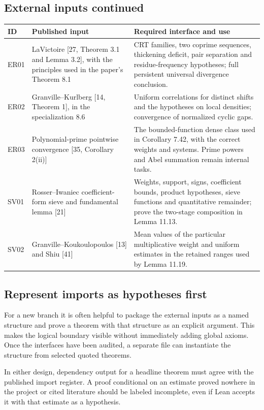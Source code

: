 \documentclass[11pt]{article}
\newcommand{\page}{\newpage}
\begin{document}
\page
\subsection*{External inputs continued}
\small
\begin{longtable}{p{.11\linewidth}p{.39\linewidth}p{.41\linewidth}}
\toprule
ID & Published input & Required interface and use\\\midrule
ER01 & LaVictoire [27, Theorem 3.1 and Lemma 3.2], with the principles used in the paper's Theorem 8.1 &
CRT families, two coprime sequences, thickening deficit, pair separation and
residue-frequency hypotheses; full persistent universal divergence conclusion.\\
ER02 & Granville--Kurlberg [14, Theorem 1], in the specialization 8.6 &
Uniform correlations for distinct shifts and the hypotheses on local densities;
convergence of normalized cyclic gaps.\\
ER03 & Polynomial-prime pointwise convergence [35, Corollary 2(ii)] &
The bounded-function dense class used in Corollary 7.42, with the correct weights
and systems. Prime powers and Abel summation remain internal tasks.\\
SV01 & Rosser--Iwaniec coefficient-form sieve and fundamental lemma [21] &
Weights, support, signs, coefficient bounds, product hypotheses, sieve functions
and quantitative remainder; prove the two-stage composition in Lemma 11.13.\\
SV02 & Granville--Koukoulopoulos [13] and Shiu [41] &
Mean values of the particular multiplicative weight and uniform estimates in the
retained ranges used by Lemma 11.19.\\\bottomrule
\end{longtable}
\normalsize

\subsection*{Represent imports as hypotheses first}
For a new branch it is often helpful to package the external inputs as a named
structure and prove a theorem with that structure as an explicit argument.
This makes the logical boundary visible without immediately adding global
axioms. Once the interfaces have been audited, a separate file can instantiate
the structure from selected quoted theorems.

In either design, dependency output for a headline theorem must agree with the
published import register. A proof conditional on an estimate proved nowhere in
the project or cited literature should be labeled incomplete, even if Lean
accepts it with that estimate as a hypothesis.
\end{document}
